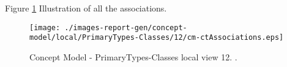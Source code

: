 Figure \ref{fig:lu.uni.lassy.excalibur.group09.spec-CM-view-local-PrimaryTypes-Classes-12} Illustration of all the associations.



\begin{figure}[htbp] 
\label{fig:lu.uni.lassy.excalibur.group09.spec-CM}
\begin{center}
\texttt{[image: ./images-report-gen/concept-model/local/PrimaryTypes-Classes/12/cm-ctAssociations.eps]}
\end{center}
\caption[Concept Model - PrimaryTypes-Classes local view 12 - ]{Concept Model - PrimaryTypes-Classes local view 12. .}
\label{fig:lu.uni.lassy.excalibur.group09.spec-CM-view-local-PrimaryTypes-Classes-12}
\end{figure}
\vspace{0.5cm} 
